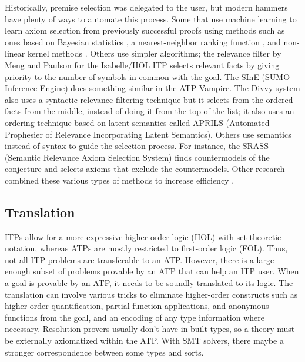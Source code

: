 \documentclass{article}
\begin{document}
		Historically, premise selection was delegated to the 
		user, but modern hammers have plenty of ways to 
		automate this process. Some that use machine learning
		to learn axiom selection from previously successful 
		proofs using methods such as ones based on 
		Bayesian statistics \cite{DBLP:journals/jar/AlamaHKTU14}, 
		a nearest-neighbor ranking function 
		\cite{DBLP:conf/cade/KaliszykU13a}, and non-linear 
		kernel methods \cite{DBLP:journals/jar/AlamaHKTU14}.
		Others use simpler algorithms; the relevance filter 
		by Meng and Paulson 
		\cite{DBLP:journals/japll/MengP09}
		for the Isabelle/HOL ITP selects relevant facts by 
		giving priority to the number of symbols in common 
		with the goal. The SInE (SUMO Inference Engine) 
		\cite{10.1007/978-3-642-22438-6_23} does something 
		similar in the ATP Vampire. The Divvy system 
		\cite{10.1007/978-3-642-02959-2_13} also uses a 
		syntactic relevance filtering technique but it 
		selects from the ordered facts from the middle, 
		instead of doing it from the top of the list; it
		also uses an ordering technique based 
		on latent semantics called APRILS (Automated 
		Prophesier of Relevance Incorporating Latent Semantics).
		Others use semantics instead of syntax to guide
		the selection process. For instance, the SRASS 
		(Semantic Relevance Axiom Selection System) 
		\cite{10.1007/978-3-540-73595-3_20} finds 
		countermodels of the conjecture and selects axioms that
		exclude the countermodels. Other research combined
		these various types of methods to increase efficiency 
		\cite{DBLP:journals/corr/KaliszykU13b, 
			10.1007/978-3-642-31365-3_30}.
		
		\subsection{Translation}
		ITPs allow for a more expressive higher-order logic
		(HOL) with set-theoretic notation, whereas ATPs 
		are mostly restricted to first-order logic (FOL). 
		Thus, not all 
		ITP problems are transferable to an ATP. However, 
		there is a large enough subset of problems provable
		by an ATP that can help an ITP user. When a goal is 
		provable by an ATP, it needs to be soundly translated 
		to its logic. The translation can involve various 
		tricks to eliminate higher-order constructs
		\cite{DBLP:journals/jar/MengP08} 
		such as higher order quantification, partial 
		function applications, and anonymous functions
		from the goal, and an encoding of any 
		type information where necessary. Resolution 
		provers usually don't have 
		in-built types, so a theory must be externally 
		axiomatized within the ATP. With SMT solvers, there
		maybe a stronger correspondence between some types and 
		sorts. 
	
\end{document}
